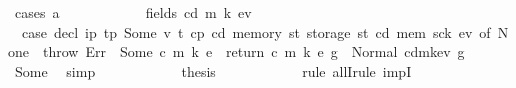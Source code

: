 \begin{isabellebody}
\ {\isacharparenleft}{\kern0pt}cases\ a{\isacharparenright}{\kern0pt}\isanewline
\ \ \ \ \ \ \ \ \ \ \isamarkupfalse%
\ {\isacharparenleft}{\kern0pt}fields\ cd{\isacharprime}{\kern0pt}{\isacharprime}{\kern0pt}\ m{\isacharprime}{\kern0pt}{\isacharprime}{\kern0pt}\ k{\isacharprime}{\kern0pt}{\isacharprime}{\kern0pt}\ e\isactrlsub v{\isacharprime}{\kern0pt}{\isacharprime}{\kern0pt}{\isacharparenright}{\kern0pt}\isanewline
\ \ \ \ \ \ \ \ \ \ \isamarkupfalse%
\ \isamarkupfalse%
\ {}{\isacharcolon}{\kern0pt}\ {\isachardoublequoteopen}{\isacharparenleft}{\kern0pt}case\ decl\ i\isactrlsub p\ t\isactrlsub p\ {\isacharparenleft}{\kern0pt}Some\ {\isacharparenleft}{\kern0pt}v{\isacharcomma}{\kern0pt}\ t{\isacharparenright}{\kern0pt}{\isacharparenright}{\kern0pt}\ cp\ cd\ {\isacharparenleft}{\kern0pt}memory\ st{\isacharparenright}{\kern0pt}\ {\isacharparenleft}{\kern0pt}storage\ st{\isacharparenright}{\kern0pt}\ {\isacharparenleft}{\kern0pt}cd{\isacharprime}{\kern0pt}{\isacharcomma}{\kern0pt}\ mem{\isacharprime}{\kern0pt}{\isacharcomma}{\kern0pt}\ sck{\isacharprime}{\kern0pt}{\isacharcomma}{\kern0pt}\ e\isactrlsub v{\isacharprime}{\kern0pt}{\isacharparenright}{\kern0pt}\ of\ None\ {\isasymRightarrow}\ throw\ Err\ {\isacharbar}{\kern0pt}\ Some\ {\isacharparenleft}{\kern0pt}c{\isacharcomma}{\kern0pt}\ m{\isacharcomma}{\kern0pt}\ k{\isacharcomma}{\kern0pt}\ e{\isacharparenright}{\kern0pt}\ {\isasymRightarrow}\ return\ {\isacharparenleft}{\kern0pt}c{\isacharcomma}{\kern0pt}\ m{\isacharcomma}{\kern0pt}\ k{\isacharcomma}{\kern0pt}\ e{\isacharparenright}{\kern0pt}{\isacharparenright}{\kern0pt}\ g{\isacharprime}{\kern0pt}{\isacharprime}{\kern0pt}\ {\isacharequal}{\kern0pt}\ Normal\ {\isacharparenleft}{\kern0pt}{\isacharparenleft}{\kern0pt}cd{\isacharprime}{\kern0pt}{\isacharprime}{\kern0pt}{\isacharcomma}{\kern0pt}m{\isacharprime}{\kern0pt}{\isacharprime}{\kern0pt}{\isacharcomma}{\kern0pt}k{\isacharprime}{\kern0pt}{\isacharprime}{\kern0pt}{\isacharcomma}{\kern0pt}e\isactrlsub v{\isacharprime}{\kern0pt}{\isacharprime}{\kern0pt}{\isacharparenright}{\kern0pt}{\isacharcomma}{\kern0pt}\ g{\isacharprime}{\kern0pt}{\isacharprime}{\kern0pt}{\isacharparenright}{\kern0pt}{\isachardoublequoteclose}\ \isamarkupfalse%
\ Some\ \isamarkupfalse%
\ simp\isanewline
\ \ \ \ \ \ \ \ \ \ \isamarkupfalse%
\ {\isacharquery}{\kern0pt}thesis\isanewline
\ \ \ \ \ \ \ \ \ \ \isamarkupfalse%
\ {\isacharparenleft}{\kern0pt}{\isacharparenleft}{\kern0pt}rule\ allI{\isacharparenright}{\kern0pt}{\isacharplus}{\kern0pt}{\isacharcomma}{\kern0pt}{\isacharparenleft}{\kern0pt}rule\ impI{\isacharparenright}{\kern0pt}{\isacharparenright}{\kern0pt}\isanewline

\end{isabellebody}
